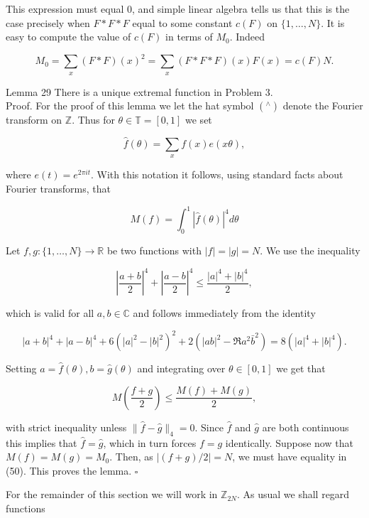 \documentclass[10pt]{article}
\begin{document}
This expression must equal 0, and simple linear algebra tells us that this is the case precisely when $F * F * F$ equal to some constant $c(F)$ on $\{1, \ldots, N\}$. It is easy to compute the value of $c(F)$ in terms of $M_{0}$. Indeed


\begin{equation*}
M_{0}=\sum_{x}(F * F)(x)^{2}=\sum_{x}(F * F * F)(x) F(x)=c(F) N . \tag{49}
\end{equation*}


Lemma 29 There is a unique extremal function in Problem 3.\\
Proof. For the proof of this lemma we let the hat symbol $\left({ }^{\wedge}\right)$ denote the Fourier transform on $\mathbb{Z}$. Thus for $\theta \in \mathbb{T}=[0,1]$ we set

$$
\hat{f}(\theta)=\sum_{x} f(x) e(x \theta),
$$

where $e(t)=e^{2 \pi i t}$. With this notation it follows, using standard facts about Fourier transforms, that

$$
M(f)=\int_{0}^{1}|\hat{f}(\theta)|^{4} d \theta
$$

Let $f, g:\{1, \ldots, N\} \rightarrow \mathbb{R}$ be two functions with $|f|=|g|=N$. We use the inequality

$$
\left|\frac{a+b}{2}\right|^{4}+\left|\frac{a-b}{2}\right|^{4} \leq \frac{|a|^{4}+|b|^{4}}{2},
$$

which is valid for all $a, b \in \mathbb{C}$ and follows immediately from the identity

$$
|a+b|^{4}+|a-b|^{4}+6\left(|a|^{2}-|b|^{2}\right)^{2}+2\left(|a b|^{2}-\Re a^{2} \bar{b}^{2}\right)=8\left(|a|^{4}+|b|^{4}\right) .
$$

Setting $a=\hat{f}(\theta), b=\hat{g}(\theta)$ and integrating over $\theta \in[0,1]$ we get that


\begin{equation*}
M\left(\frac{f+g}{2}\right) \leq \frac{M(f)+M(g)}{2}, \tag{50}
\end{equation*}


with strict inequality unless $\|\hat{f}-\hat{g}\|_{4}=0$. Since $\hat{f}$ and $\hat{g}$ are both continuous this implies that $\hat{f}=\hat{g}$, which in turn forces $f=g$ identically. Suppose now that $M(f)=M(g)=M_{0}$. Then, as $|(f+g) / 2|=N$, we must have equality in (50). This proves the lemma. \(\square\)

For the remainder of this section we will work in $\mathbb{Z}_{2 N}$. As usual we shall regard functions
\end{document}
